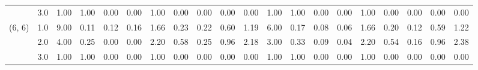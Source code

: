 \begin{tabular}{llrrrrrrrrrrrrrrrrrr}
       & 3.0 &               1.00 &                     1.00 &                                 0.00 &                             0.00 &                           1.00 &                                               0.00 &                                            0.00 &                                            0.00 &                                        0.00 &               1.00 &                     1.00 &                                 0.00 &                             0.00 &                           1.00 &                                               0.00 &                                            0.00 &                                            0.00 &                                        0.00 \\
(6, 6) & 1.0 &               9.00 &                     0.11 &                                 0.12 &                             0.16 &                           1.66 &                                               0.23 &                                            0.22 &                                            0.60 &                                        1.19 &               6.00 &                     0.17 &                                 0.08 &                             0.06 &                           1.66 &                                               0.20 &                                            0.12 &                                            0.59 &                                        1.22 \\
       & 2.0 &               4.00 &                     0.25 &                                 0.00 &                             0.00 &                           2.20 &                                               0.58 &                                            0.25 &                                            0.96 &                                        2.18 &               3.00 &                     0.33 &                                 0.09 &                             0.04 &                           2.20 &                                               0.54 &                                            0.16 &                                            0.96 &                                        2.38 \\
       & 3.0 &               1.00 &                     1.00 &                                 0.00 &                             0.00 &                           1.00 &                                               0.00 &                                            0.00 &                                            0.00 &                                        0.00 &               1.00 &                     1.00 &                                 0.00 &                             0.00 &                           1.00 &                                               0.00 &                                            0.00 &                                            0.00 &                                        0.00 \\
\bottomrule
\end{tabular}

